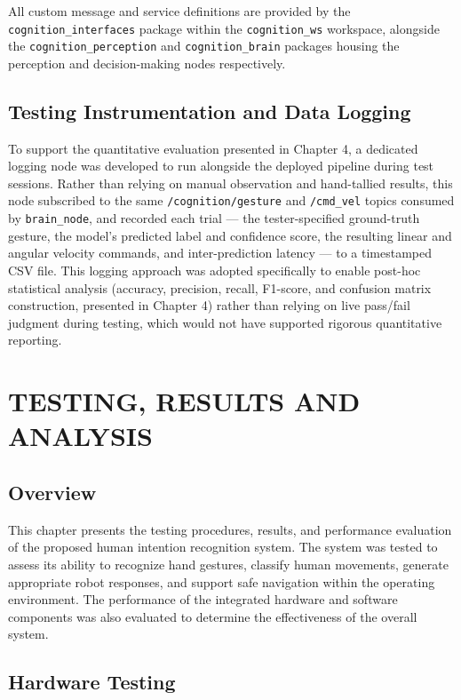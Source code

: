 All custom message and service definitions are provided by the \texttt{cognition\_interfaces}
package within the \texttt{cognition\_ws} workspace, alongside the \texttt{cognition\_perception}
and \texttt{cognition\_brain} packages housing the perception and decision-making nodes
respectively.

\section{Testing Instrumentation and Data Logging}
\label{sec:testing_instrumentation}
To support the quantitative evaluation presented in Chapter 4, a dedicated logging node was developed to run alongside the deployed pipeline during test sessions. Rather than relying on manual observation and hand-tallied results, this node subscribed to the same \texttt{/cognition/gesture} and \texttt{/cmd\_vel} topics consumed by \texttt{brain\_node}, and recorded each trial — the tester-specified ground-truth gesture, the model's predicted label and confidence score, the resulting linear and angular velocity commands, and inter-prediction latency — to a timestamped CSV file. This logging approach was adopted specifically to enable post-hoc statistical analysis (accuracy, precision, recall, F1-score, and confusion matrix construction, presented in Chapter 4) rather than relying on live pass/fail judgment during testing, which would not have supported rigorous quantitative reporting.

\chapter{TESTING, RESULTS AND ANALYSIS}

\section{Overview}
This chapter presents the testing procedures, results, and performance evaluation of the proposed human intention recognition system. The system was tested to assess its ability to recognize hand gestures, classify human movements, generate appropriate robot responses, and support safe navigation within the operating environment. The performance of the integrated hardware and software components was also evaluated to determine the effectiveness of the overall system.
\section{Hardware Testing}

